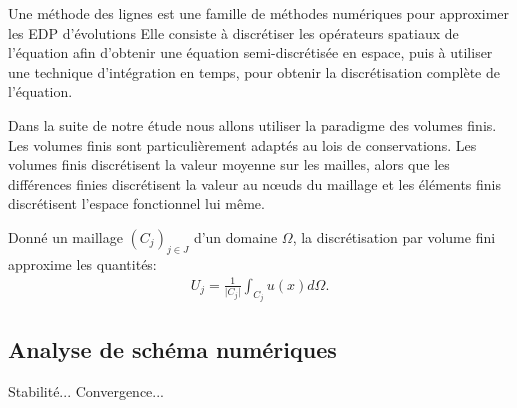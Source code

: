 \begin{definition}
    Une méthode des lignes est une famille de méthodes numériques pour approximer les EDP d'évolutions
    Elle consiste à discrétiser les opérateurs spatiaux de l'équation afin d'obtenir une équation semi-discrétisée en espace,
    puis à utiliser une technique d'intégration en temps, pour obtenir la discrétisation complète de l'équation.
\end{definition}

\begin{definition}
\end{definition}

Dans la suite de notre étude nous allons utiliser la paradigme des volumes finis.
Les volumes finis sont particulièrement adaptés au lois de conservations.
Les volumes finis discrétisent la valeur moyenne sur les mailles, alors que les différences finies discrétisent la valeur au nœuds du maillage et 
les éléments finis discrétisent l'espace fonctionnel lui même.
\begin{definition}
    Donné un maillage $(C_j)_{j\in J}$ d'un domaine $\Omega$, la discrétisation par volume fini approxime les quantités:
    \begin{align}
        U_j = \frac{1}{\vert C_j \vert} \int_{C_j} u(x) d\Omega.
    \end{align}
\end{definition}
\subsection{Analyse de schéma numériques}
Stabilité... Convergence...
\begin{definition}
\end{definition}
\begin{definition}
\end{definition}